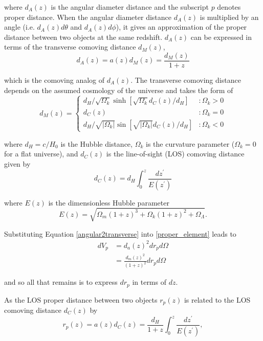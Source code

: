 \documentclass[%
 reprint,
 amsmath,amssymb,
 aps,nofootinbib
]{revtex4-1}
\begin{document}
\noindent where $d_A(z)$ is the angular diameter distance and the subscript $p$ denotes proper distance. When the angular diameter distance $d_A(z)$ is multiplied by an angle (i.e. $d_A(z)d\theta$ and $d_A(z)d\phi$), it gives an approximation of the proper distance between two objects at the same redshift. $d_A(z)$ can be expressed in terms of the transverse comoving distance $d_M(z)$,
\begin{equation}\label{angular2transverse}
d_A(z)=a(z)d_M(z)=\frac{d_M(z)}{1+z}
\end{equation}

\noindent which is the comoving analog of $d_A(z)$. The transverse comoving distance depends on the assumed cosmology of the universe and takes the form of
\begin{equation}\label{comoving_transverse}
d_M(z)=\left\{
     \begin{array}{lr}
       d_H/\sqrt{\Omega_k}\sinh\left[\sqrt{\Omega_k}d_C(z)/d_H\right] & : \Omega_k>0\\
       d_C(z) & : \Omega_k=0\\
       d_H/\sqrt{|\Omega_k|}\sin\left[\sqrt{|\Omega_k|}d_C(z)/d_H\right] & : \Omega_k<0
     \end{array}
   \right.
\end{equation}

\noindent where $d_H=c/H_0$ is the Hubble distance, $\Omega_k$ is the curvature parameter ($\Omega_k=0$ for a flat universe), and $d_C(z)$ is the line-of-sight (LOS) comoving distance given by
\begin{equation}\label{comoving_distance}
d_C(z)=d_H\int_0^z\frac{dz^\prime}{E(z^\prime)}
\end{equation}

\noindent where $E(z)$ is the dimensionless Hubble parameter
\begin{equation}\label{dim_hubble_parameter}
E(z)=\sqrt{\Omega_m(1+z)^3+\Omega_k(1+z)^2+\Omega_\Lambda}.
\end{equation}

\noindent Substituting Equation \eqref{angular2transverse} into \eqref{proper_element} leads to
\begin{align}\label{temp_solution}
dV_p&=d_a(z)^2dr_pd\Omega\nonumber\\
&=\frac{d_m(z)^2}{(1+z)^2}dr_pd\Omega
\end{align}

\noindent and so all that remains is to express $dr_p$ in terms of $dz$.

As the LOS proper distance between two objects $r_p(z)$ is related to the LOS comoving distance $d_C(z)$ by
\begin{equation}\label{physical2comoving}
r_p(z)=a(z)d_C(z)=\frac{d_H}{1+z}\int_0^z\frac{dz^\prime}{E(z^\prime)},
\end{equation}
\end{document}
